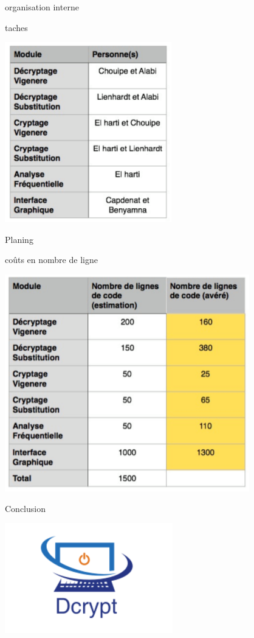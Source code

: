 \documentclass[10pt,xcolor=table]{beamer}
\begin{document}
\begin{frame}
	\begin{block}{organisation interne}
	\end{block}
	\begin{block}{taches}
	\begin{center}
		\includegraphics[scale =0.45]{taches.png} \\ 
	\end{center}
	\end{block}
\end{frame}
\begin{frame}
	\begin{block}{Planing}
	\end{block}
	\begin{block}{coûts en nombre de ligne}
	\begin{center}
		\includegraphics[scale =0.3]{tabl.png} \\ 
	\end{center}
	\end{block}
\end{frame}
\begin{frame}
\begin{center}
\Huge {Conclusion}\pause
\end{center}
\begin{center}
\includegraphics[scale =0.5]{logo.png}
\end{center}
\end{frame}
\end{document}
